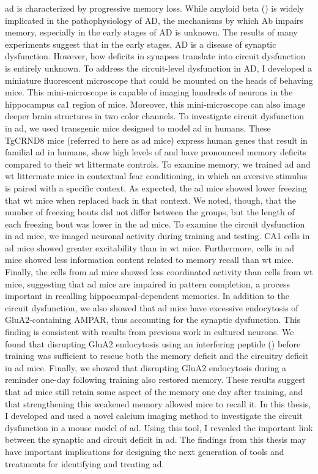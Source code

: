 \Gls{ad} is characterized by progressive memory loss. While amyloid beta (\abeta{}) is widely implicated in the pathophysiology of AD, the mechanisms by which Ab impairs memory, especially in the early stages of AD is unknown. The results of many experiments suggest that in the early stages, AD is a disease of synaptic dysfunction. However, how deficits in synapses translate into circuit dysfunction is entirely unknown. To address the circuit-level dysfunction in AD, I developed a miniature fluorescent microscope that could be mounted on the heads of behaving mice. This mini-microscope is capable of imaging hundreds of neurons in the hippocampus \gls{ca1} region of mice. Moreover, this mini-microscope can also image deeper brain structures in two color channels. 
To investigate circuit dysfunction in \gls{ad}, we used transgenic mice designed to model \gls{ad} in humans. These TgCRND8 mice (referred to here as \gls{ad} mice) express human genes that result in familial \gls{ad} in humans, show high levels of \abeta{} and have pronounced memory deficits compared to their \gls{wt} littermate controls. To examine memory, we trained \gls{ad} and \gls{wt} littermate mice in contextual fear conditioning, in which an aversive stimulus is paired with a specific context. As expected, the \gls{ad} mice showed lower freezing that \gls{wt} mice when replaced back in that context. We noted, though, that the number of freezing bouts did not differ between the groups, but the length of each freezing bout was lower in the \gls{ad} mice. To examine the circuit dysfunction in \gls{ad} mice, we imaged neuronal activity during training and testing. CA1 cells in \gls{ad} mice showed greater excitability than in \gls{wt} mice. Furthermore, cells in \gls{ad} mice showed less information content related to memory recall than \gls{wt} mice. Finally, the cells from \gls{ad} mice showed less coordinated activity than cells from \gls{wt} mice, suggesting that \gls{ad} mice are impaired in pattern completion, a process important in recalling hippocampal-dependent memories.
In addition to the circuit dysfunction, we also showed that \gls{ad} mice have excessive endocytosis of GluA2-containing AMPAR, thus accounting for the synaptic dysfunction. This finding is consistent with results from previous work in cultured neurons. We found that disrupting GluA2 endocytosis using an interfering peptide (\tglu{}) before training was sufficient to rescue both the memory deficit and the circuitry deficit in \gls{ad} mice. Finally, we showed that disrupting GluA2 endocytosis during a reminder one-day following training also restored memory. These results suggest that \gls{ad} mice still retain some aspect of the memory one day after training, and that strengthening this weakened memory allowed mice to recall it.
In this thesis, I developed and used a novel calcium imaging method to investigate the circuit dysfunction in a mouse model of \gls{ad}. Using this tool, I revealed the important link between the synaptic and circuit deficit in \gls{ad}. The findings from this thesis may have important implications for designing the next generation of tools and treatments for identifying and treating \gls{ad}.

